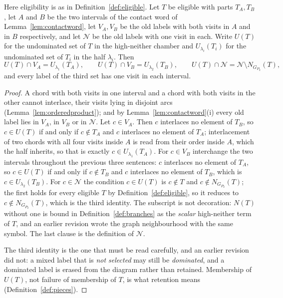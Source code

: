 \begin{lemma}\label{lem:ownermap}
Here eligibility is as in Definition~\ref{def:eligible}.
Let $T$ be eligible with parts $T_A,T_B$, let $A$ and $B$ be the two intervals
of the contact word of Lemma~\ref{lem:contactword}, let $V_A,V_B$ be the old
labels with both visits in $A$ and in $B$ respectively, and let $\mathcal N$ be
the old labels with one visit in each. Write $U(T)$ for the undominated set of $T$ in the high-neither
chamber and $U_{\lambda_i}(T_i)$ for the undominated set of $T_i$ in the half
$\lambda_i$. Then
\[
   U(T)\cap V_A=U_{\lambda_1}(T_A),\qquad
   U(T)\cap V_B=U_{\lambda_2}(T_B),\qquad
   U(T)\cap\mathcal N=\mathcal N\setminus N_{G_{P_2}}(T),
\]
and every label of the third set has one visit in each interval.

\end{lemma}
\begin{proof}
A chord with both visits in one interval and a chord with both visits in the
other cannot interlace, their visits lying in disjoint arcs
(Lemma~\ref{lem:orderedproduct}); and by Lemma~\ref{lem:contactword}(i) every
old label lies in $V_A$, in $V_B$ or in $\mathcal N$. Let $c\in V_A$. Then $c$
interlaces no element of $T_B$, so $c\in U(T)$ if and only if $c\notin T_A$ and
$c$ interlaces no element of $T_A$; interlacement of two chords with all four
visits inside $A$ is read from their order inside $A$, which the half inherits,
so that is exactly $c\in U_{\lambda_1}(T_A)$. For $c\in V_B$ interchange the
two intervals throughout the previous three sentences: $c$ interlaces no element
of $T_A$, so $c\in U(T)$ if and only if $c\notin T_B$ and $c$ interlaces no
element of $T_B$, which is $c\in U_{\lambda_2}(T_B)$. For $c\in\mathcal N$ the condition $c\in U(T)$ is $c\notin T$ and
$c\notin N_{G_{P_2}}(T)$; the first holds for every eligible $T$ by
Definition~\ref{def:eligible}, so it reduces to $c\notin N_{G_{P_2}}(T)$, which
is the third identity. The subscript is not decoration: $N(T)$ without one is
bound in Definition~\ref{def:branches} as the \emph{scalar} high-neither term of
$T$, and an earlier revision wrote the graph neighbourhood with the same
symbol. The last clause is the definition of $\mathcal N$.

The third identity is the one that must be read carefully, and an earlier
revision did not: a mixed label that is \emph{not selected} may still be
\emph{dominated}, and a dominated label is erased from the diagram rather than
retained. Membership of $U(T)$, not failure of membership of $T$, is what
retention means (Definition~\ref{def:pieces}).
\end{proof}

